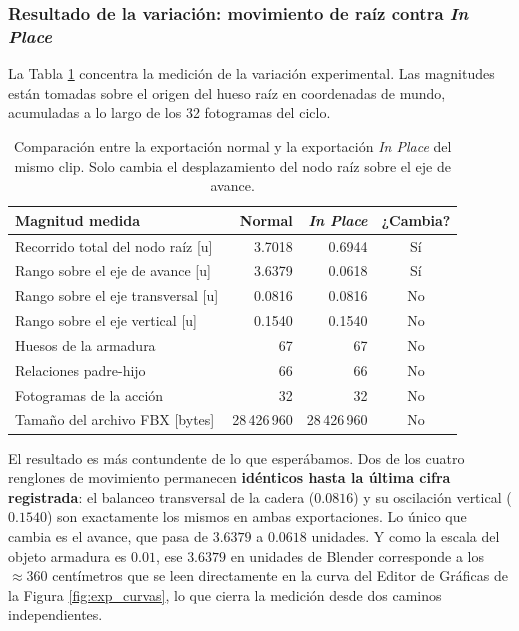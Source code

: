 \subsubsection{Resultado de la variación: movimiento de raíz contra \textit{In Place}}
La Tabla \ref{tab:variacion_raiz} concentra la medición de la variación experimental. Las magnitudes están tomadas sobre el origen del hueso raíz en coordenadas de mundo, acumuladas a lo largo de los 32 fotogramas del ciclo.

\begin{table}[H]
\centering
\begin{tabular}{@{}p{7.0cm}rrc@{}}
\toprule
\textbf{Magnitud medida} & \textbf{Normal} & \textbf{\textit{In Place}} & \textbf{¿Cambia?} \\
\midrule
Recorrido total del nodo raíz [u]      & 3.7018 & 0.6944 & Sí \\
Rango sobre el eje de avance [u]       & 3.6379 & 0.0618 & Sí \\
Rango sobre el eje transversal [u]     & 0.0816 & 0.0816 & No \\
Rango sobre el eje vertical [u]        & 0.1540 & 0.1540 & No \\
\midrule
Huesos de la armadura                  & 67 & 67 & No \\
Relaciones padre-hijo                  & 66 & 66 & No \\
Fotogramas de la acción                & 32 & 32 & No \\
Tamaño del archivo FBX [bytes]         & 28\,426\,960 & 28\,426\,960 & No \\
\bottomrule
\end{tabular}
\caption{Comparación entre la exportación normal y la exportación \textit{In Place} del mismo clip. Solo cambia el desplazamiento del nodo raíz sobre el eje de avance.}
\label{tab:variacion_raiz}
\end{table}

El resultado es más contundente de lo que esperábamos. Dos de los cuatro renglones de movimiento permanecen \textbf{idénticos hasta la última cifra registrada}: el balanceo transversal de la cadera ($0.0816$) y su oscilación vertical ($0.1540$) son exactamente los mismos en ambas exportaciones. Lo único que cambia es el avance, que pasa de $3.6379$ a $0.0618$ unidades. Y como la escala del objeto armadura es $0.01$, ese $3.6379$ en unidades de Blender corresponde a los $\approx 360$ centímetros que se leen directamente en la curva del Editor de Gráficas de la Figura \ref{fig:exp_curvas}, lo que cierra la medición desde dos caminos independientes.

